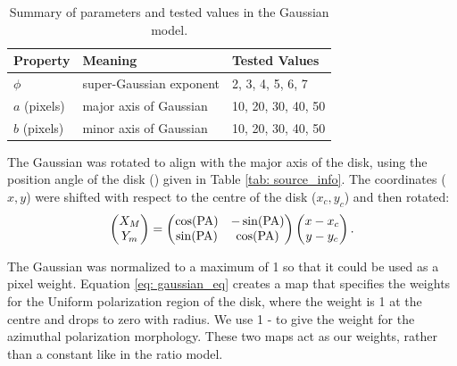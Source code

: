 

\begin{table}[h!]
\centering
\caption{Summary of parameters and tested values in the Gaussian model.  }
\begin{tabular}{lll}
\toprule
\textbf{Property} &
\textbf{Meaning} &
\textbf{Tested Values}  \\
\midrule

$\phi$
& super-Gaussian exponent
& 2, 3, 4, 5, 6, 7\\


$a$ (pixels)
& major axis of Gaussian
& 10, 20, 30, 40, 50\\

$b$ (pixels)
& minor axis of Gaussian
& 10, 20, 30, 40, 50\\

\bottomrule
\end{tabular}
\label{tab: gaussian_model_info}
\end{table}


The Gaussian was rotated to align with the major axis of the disk, using the position angle of the disk (\PAns) given in Table \ref{tab: source_info}. The coordinates ($x, y$) were shifted with respect to the centre of the disk ($x_c, y_c$) and then rotated:
\begin{equation}
\begin{pmatrix}
X_M \\
Y_m
\end{pmatrix}
=
\begin{pmatrix}
\cos(\text{PA}) & -\sin(\text{PA}) \\
\sin(\text{PA}) & \cos(\text{PA})
\end{pmatrix}
\begin{pmatrix}
x - x_c \\
y - y_c
\end{pmatrix}.
\label{eq:rotated_coordinates}
\end{equation}





\noindent The Gaussian was normalized to a maximum of 1 so that it could be used as a pixel weight. Equation \ref{eq: gaussian_eq} creates a map that specifies the weights for the Uniform polarization region of the disk, where the weight is 1 at the centre and drops to zero with radius.  We use 1 - \Wuni to give the weight for the azimuthal polarization morphology. These two maps act as our weights, rather than a constant like in the ratio model. 


